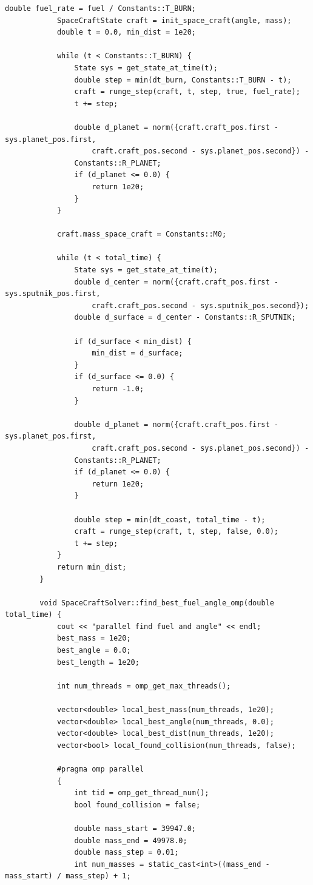 \documentclass[14pt,a4paper]{extarticle}
\theoremstyle{plain}
\begin{document}
\begin{lstlisting}[title=spacecraftSolver.cpp, gobble=16, breaklines=true, breakatwhitespace=true]
			double fuel_rate = fuel / Constants::T_BURN;
			SpaceCraftState craft = init_space_craft(angle, mass);
			double t = 0.0, min_dist = 1e20;
			
			while (t < Constants::T_BURN) {
				State sys = get_state_at_time(t);
				double step = min(dt_burn, Constants::T_BURN - t);
				craft = runge_step(craft, t, step, true, fuel_rate);
				t += step;
				
				double d_planet = norm({craft.craft_pos.first - sys.planet_pos.first,
					craft.craft_pos.second - sys.planet_pos.second}) -
				Constants::R_PLANET;
				if (d_planet <= 0.0) {
					return 1e20;
				}
			}
			
			craft.mass_space_craft = Constants::M0;
			
			while (t < total_time) {
				State sys = get_state_at_time(t);
				double d_center = norm({craft.craft_pos.first - sys.sputnik_pos.first,
					craft.craft_pos.second - sys.sputnik_pos.second});
				double d_surface = d_center - Constants::R_SPUTNIK;
				
				if (d_surface < min_dist) {
					min_dist = d_surface;
				}
				if (d_surface <= 0.0) {
					return -1.0;
				}
				
				double d_planet = norm({craft.craft_pos.first - sys.planet_pos.first,
					craft.craft_pos.second - sys.planet_pos.second}) -
				Constants::R_PLANET;
				if (d_planet <= 0.0) {
					return 1e20;
				}
				
				double step = min(dt_coast, total_time - t);
				craft = runge_step(craft, t, step, false, 0.0);
				t += step;
			}
			return min_dist;
		}
		
		void SpaceCraftSolver::find_best_fuel_angle_omp(double total_time) {
			cout << "parallel find fuel and angle" << endl;
			best_mass = 1e20;
			best_angle = 0.0;
			best_length = 1e20;
			
			int num_threads = omp_get_max_threads();
			
			vector<double> local_best_mass(num_threads, 1e20);
			vector<double> local_best_angle(num_threads, 0.0);
			vector<double> local_best_dist(num_threads, 1e20);
			vector<bool> local_found_collision(num_threads, false);
			
			#pragma omp parallel
			{
				int tid = omp_get_thread_num();
				bool found_collision = false;
				
				double mass_start = 39947.0;
				double mass_end = 49978.0;
				double mass_step = 0.01;
				int num_masses = static_cast<int>((mass_end - mass_start) / mass_step) + 1;
				

\end{lstlisting}
\end{document}
